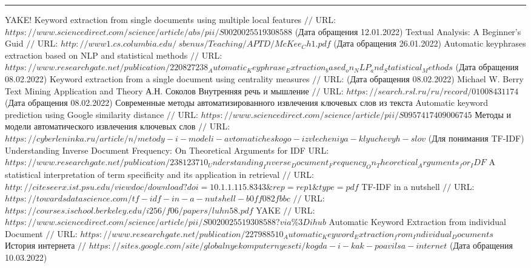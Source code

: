 
\makeatletter \renewcommand{} \makeatother
\renewcommand\refname{Список использованных источников}
\begin{thebibliography}{00}
	\hrule	
	YAKE! Keyword extraction from single documents using multiple local features $//$ URL: $https://www.sciencedirect.com/science/article/abs/pii/S0020025519308588$ (Дата обращения 12.01.2022)
	Textual Analysis: A Beginner's Guid  $//$ URL: $http://www1.cs.columbia.edu/~sbenus/Teaching/APTD/McKee_Ch1.pdf$ (Дата обращения 26.01.2022)
	Automatic keyphrases extraction based on NLP  and statistical methods $//$ URL: $https://www.researchgate.net/publication/220827238_Automatic_Keyphrase_Extraction_based_on_NLP_and_Statistical_Methods$ (Дата обращения 08.02.2022)
	Keyword extraction from a single document using centrality measures $//$ URL:  (Дата обращения 08.02.2022)
	Michael W. Berry Text Mining Application and Theory
	А.Н. Соколов Внутренняя речь и мышление $//$ URL: $https://search.rsl.ru/ru/record/01008431174$ (Дата обращения 08.02.2022)
	Современные методы автоматизированного извлечения ключевых слов из текста
	Automatic keyword prediction using Google similarity distance $//$ URL: $https://www.sciencedirect.com/science/article/pii/S0957417409006745$
	Методы и модели автоматического извлечения ключевых слов $//$ URL: $https://cyberleninka.ru/article/n/metody-i-modeli-avtomaticheskogo-izvlecheniya-klyuchevyh-slov$
	(Для понимания TF-IDF) Understanding Inverse Document Frequency: On Theoretical Arguments for IDF URL: $https://www.researchgate.net/publication/238123710_Understanding_Inverse_Document_Frequency_On_Theoretical_Arguments_for_IDF$
	A statistical interpretation of term specificity and its application in retrieval $//$ URL: $http://citeseerx.ist.psu.edu/viewdoc/download?doi=10.1.1.115.8343\&rep=rep1\&type=pdf$
	TF-IDF in a nutshell $//$ URL: $https://towardsdatascience.com/tf-idf-in-a-nutshell-b0ff082fbbc$
	 $//$ URL: $https://courses.ischool.berkeley.edu/i256/f06/papers/luhn58.pdf$
	YAKE $//$ URL: $https://www.sciencedirect.com/science/article/pii/S0020025519308588?via\%3Dihub$
	Automatic Keyword Extraction from individual Document
	$//$ URL: $https://www.researchgate.net/publication/227988510_Automatic_Keyword_Extraction_from_Individual_Documents$
	История интернета $//$ $https://sites.google.com/site/globalnyekomputernyeseti/kogda-i-kak-poavilsa-internet$ (Дата обращения 10.03.2022)

\end{thebibliography}
